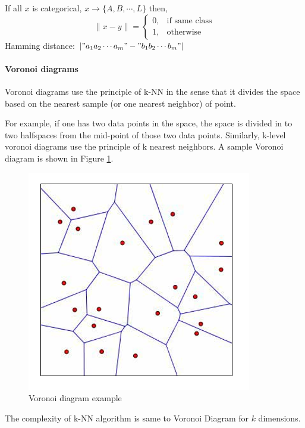 \documentclass{article}
\begin{document}
{{        If all $x$ is categorical, \(x \rightarrow \{A,B,\cdots,L\}\) then,
        \[\| x - y\| = \begin{cases}
            0,  &  \text{if same class}\\
            1,  &  \text{otherwise}
        \end{cases}\]
        Hamming distance: \(| "a_1a_2\cdots a_m" - "b_1b_2\cdots b_m" |\)

        \paragraph{Voronoi diagrams}{
            Voronoi diagrams use the principle of k-NN in the sense that it divides the space based on the nearest sample (or one nearest neighbor) of point. 

            For example, if one has two data points in the space, the space is divided in to two halfspaces from the mid-point of those two data points. Similarly, k-level voronoi diagrams use the principle of k nearest neighbors. A sample Voronoi diagram is shown in Figure \ref{Fig.2}.
            \begin{figure}
                \label{Fig.2}   
                \begin{center}
                    \includegraphics[scale=0.5]{voronoiExample.PNG}
                    \caption{Voronoi diagram example}
                \end{center}
            \end{figure}

            The complexity of k-NN algorithm is same to Voronoi Diagram for $k$ dimensions.

}}}
\end{document}
